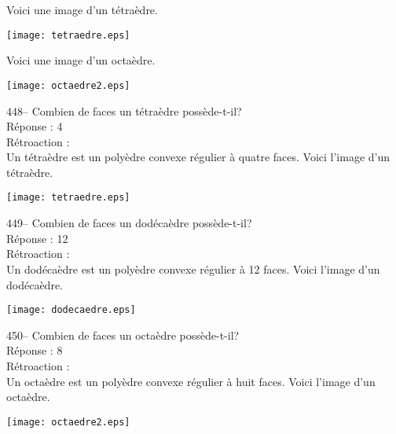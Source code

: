 ﻿\documentclass[letterpaper, 12pt]{article}
\begin{document}
Voici une image d'un t\'etra\`edre.\\
    \begin{center}
    \texttt{[image: tetraedre.eps]}
    \end{center}
Voici une image d'un octa\`edre.\\
    \begin{center}
    \texttt{[image: octaedre2.eps]}
    \end{center}



448--  Combien de faces un t\'etra\`edre poss\`ede-t-il?\\

R\'eponse : 4\\

R\'etroaction : \\
Un t\'etra\`edre est un poly\`edre convexe r\'egulier \`a quatre faces.
Voici l'image d'un t\'etra\`edre.\\
    \begin{center}
    \texttt{[image: tetraedre.eps]}
    \end{center}

449--  Combien de faces un dod\'eca\`edre poss\`ede-t-il?\\

R\'eponse : 12\\

R\'etroaction : \\
Un dod\'eca\`edre est un poly\`edre convexe r\'egulier \`a 12 faces.  Voici
l'image d'un dod\'eca\`edre.\\
    \begin{center}
    \texttt{[image: dodecaedre.eps]}
    \end{center}


450--  Combien de faces un octa\`edre poss\`ede-t-il?\\

R\'eponse : 8\\

R\'etroaction : \\
Un octa\`edre est un poly\`edre convexe r\'egulier \`a huit faces.  Voici
l'image d'un octa\`edre.\\
    \begin{center}
    \texttt{[image: octaedre2.eps]}
    \end{center}
\end{document}
